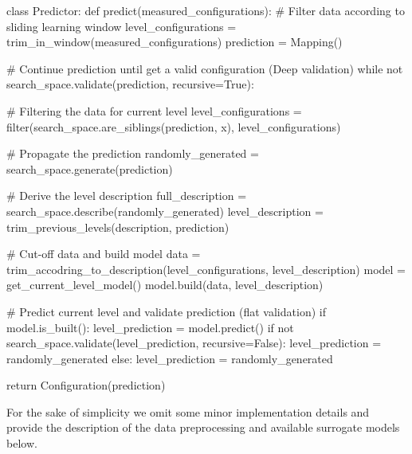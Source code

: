\begin{code}[language=Python, caption=P.F.R.1 + P.F.R.3 implementation pseudo-code., label=impl: P.F.R.1 + P.F.R.3 implementation pseudocode]
class Predictor:
	def predict(measured_configurations):
		# Filter data according to sliding learning window
		level_configurations = trim_in_window(measured_configurations)
		prediction = Mapping()
		
		# Continue prediction until get a valid configuration (Deep validation)
		while not search_space.validate(prediction, recursive=True):
		
			# Filtering the data for current level
			level_configurations = filter(search_space.are_siblings(prediction, x), level_configurations)
			
			# Propagate the prediction
			randomly_generated = search_space.generate(prediction)
			
			# Derive the level description
			full_description = search_space.describe(randomly_generated)
			level_description = trim_previous_levels(description, prediction)
			
			# Cut-off data and build model
			data = trim_accodring_to_description(level_configurations, level_description)
			model = get_current_level_model()
			model.build(data, level_description)
			
			# Predict current level and validate prediction (flat validation)
			if model.is_built():
				level_prediction = model.predict()
				if not search_space.validate(level_prediction, recursive=False):
					level_prediction = randomly_generated
			else:
				level_prediction = randomly_generated
		
		return Configuration(prediction)
\end{code}

For the sake of simplicity we omit some minor implementation details and provide the description of the data preprocessing and available surrogate models below.

